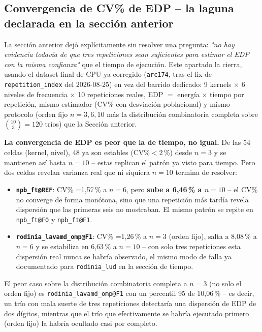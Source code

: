 \subsection{Convergencia de CV\% de EDP -- la laguna declarada en la sección anterior}

La sección anterior dejó explícitamente sin resolver una pregunta:
\emph{"no hay evidencia todavía de que tres repeticiones sean suficientes
para estimar el EDP con la misma confianza"} que el tiempo de ejecución.
Este apartado la cierra, usando el dataset final de CPU ya corregido
(\texttt{arc174}, tras el fix de \texttt{repetition\_index} del
2026-08-25) en vez del barrido dedicado: 9 kernels $\times$ 6 niveles de
frecuencia $\times$ 10 repeticiones reales, EDP $=$ energía $\times$
tiempo por repetición, mismo estimador (CV\% con desviación poblacional)
y mismo protocolo (orden fijo $n=3,6,10$ más la distribución combinatoria
completa sobre $\binom{10}{3}=120$ tríos) que la Sección anterior.

\textbf{La convergencia de EDP es peor que la de tiempo, no igual.} De las
54 celdas (kernel, nivel), 48 ya son estables (CV\%$<$2\,\%) desde $n=3$ y
se mantienen así hasta $n=10$ -- estas replican el patrón ya visto para
tiempo. Pero dos celdas revelan varianza real que ni siquiera $n=10$
termina de resolver:

\begin{itemize}
  \item \textbf{\texttt{npb\_ft@REF}}: CV\% =1{,}57\,\% a $n=6$, pero
    \textbf{sube a 6{,}46\,\% a $n=10$} -- el CV\% no converge de forma
    monótona, sino que una repetición más tardía revela dispersión que
    las primeras seis no mostraban. El mismo patrón se repite en
    \texttt{npb\_ft@F0} y \texttt{npb\_ft@F1}.
  \item \textbf{\texttt{rodinia\_lavamd\_omp@F1}}: CV\% =1{,}26\,\% a
    $n=3$ (orden fijo), salta a 8{,}08\,\% a $n=6$ y se estabiliza en
    6{,}63\,\% a $n=10$ -- con solo tres repeticiones esta dispersión
    real nunca se habría observado, el mismo modo de falla ya documentado
    para \texttt{rodinia\_lud} en la sección de tiempo.
\end{itemize}

El peor caso sobre la distribución combinatoria completa a $n=3$ (no solo
el orden fijo) es \texttt{rodinia\_lavamd\_omp@F1} con un percentil 95 de
10{,}06\,\% -- es decir, un trío con mala suerte de tres repeticiones
detectaría una dispersión de EDP de dos dígitos, mientras que el trío que
efectivamente se habría ejecutado primero (orden fijo) la habría ocultado
casi por completo.

